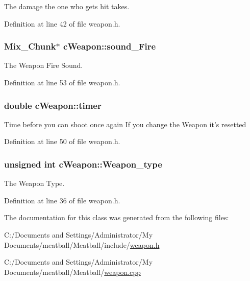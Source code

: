 The damage the one who gets hit takes. 



Definition at line 42 of file weapon.\-h.

\hypertarget{classc_weapon_a3502c93a2f35dbcc0f9e91598de8f864}{
\subsubsection[{sound\-\_\-\-Fire}]{\setlength{\rightskip}{0pt plus 5cm}Mix\-\_\-\-Chunk$\ast$ c\-Weapon\-::sound\-\_\-\-Fire}}\label{classc_weapon_a3502c93a2f35dbcc0f9e91598de8f864}


The Weapon Fire Sound. 



Definition at line 53 of file weapon.\-h.

\hypertarget{classc_weapon_ad8adebfcb59e5f2cd61951f87691da6a}{
\subsubsection[{timer}]{\setlength{\rightskip}{0pt plus 5cm}double c\-Weapon\-::timer}}\label{classc_weapon_ad8adebfcb59e5f2cd61951f87691da6a}
Time before you can shoot once again If you change the Weapon it's resetted 

Definition at line 50 of file weapon.\-h.

\hypertarget{classc_weapon_a457996bcbe591da765dfb8b427a72f29}{
\subsubsection[{Weapon\-\_\-type}]{\setlength{\rightskip}{0pt plus 5cm}unsigned int c\-Weapon\-::\-Weapon\-\_\-type}}\label{classc_weapon_a457996bcbe591da765dfb8b427a72f29}


The Weapon Type. 



Definition at line 36 of file weapon.\-h.



The documentation for this class was generated from the following files\-:\begin{DoxyCompactItemize}
\item 
C\-:/\-Documents and Settings/\-Administrator/\-My Documents/meatball/\-Meatball/include/\hyperlink{weapon_8h}{weapon.\-h}\item 
C\-:/\-Documents and Settings/\-Administrator/\-My Documents/meatball/\-Meatball/\hyperlink{weapon_8cpp}{weapon.\-cpp}\end{DoxyCompactItemize}
